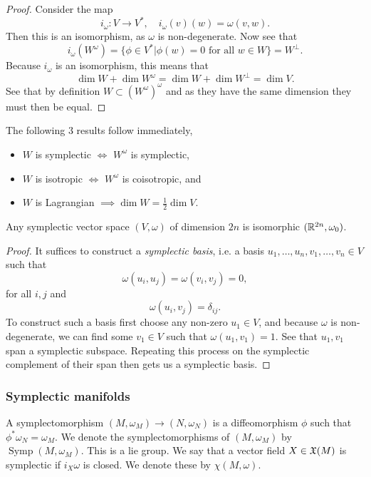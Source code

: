 \begin{proof}
    Consider the map
    \[i_\omega:V\to V^*,\quad i_\omega(v)(w)=\omega(v,w).\]
    Then this is an isomorphism, as $\omega$ is non-degenerate.
    Now see that
    \[i_\omega(W^\omega)=\{\phi\in V^*|\phi(w)=0\text{ for all }w\in W\}=W^\perp.\]
    Because $i_\omega$ is an isomorphism, this means that
    \[\dim W+\dim W^\omega=\dim W+\dim W^\perp=\dim V.\]
    See that by definition $W\subset(W^\omega)^\omega$ and as they have the same dimension they must then be equal.
\end{proof}

\begin{cor}
The following $3$ results follow immediately,
\begin{itemize}
    \item $W$ is symplectic $\iff$ $W^\omega$ is symplectic,
    \item $W$ is isotropic $\iff$ $W^\omega$ is coisotropic, and
    \item $W$ is Lagrangian $\implies\dim W=\frac12\dim V$.
\end{itemize}
\end{cor}

\begin{thm}
    Any symplectic vector space $(V,\omega)$ of dimension $2n$ is isomorphic $(\mathbb{R}^{2n},\omega_0)$.
\end{thm}

\begin{proof}
    It suffices to construct a \emph{symplectic basis}, i.e. a basis $u_1,\ldots,u_n,v_1,\ldots,v_n\in V$ such that
    \[\omega(u_i,u_j)=\omega(v_i,v_j)=0,\]
    for all $i,j$ and
    \[\omega(u_i,v_j)=\delta_{ij}.\]
    To construct such a basis first choose any non-zero $u_1\in V$, and because $\omega$ is non-degenerate, we can find some $v_1\in V$ such that $\omega(u_1,v_1)=1$.
    See that $u_1,v_1$ span a symplectic subspace.
    Repeating this process on the symplectic complement of their span then gets us a symplectic basis.
\end{proof}

\subsubsection*{Symplectic manifolds}
\begin{dfn}
    A symplectomorphism $(M,\omega_M)\to(N,\omega_N)$ is a diffeomorphism $\phi$ such that $\phi^*\omega_N=\omega_M$.
    We denote the symplectomorphisms of $(M,\omega_M)$ by $\operatorname{Symp}(M,\omega_M)$.
    This is a lie group.
    We say that a vector field $X\in\mathfrak{X}(M)$ is symplectic if $i_X\omega$ is closed.
    We denote these  by $\chi(M,\omega)$.
\end{dfn}

